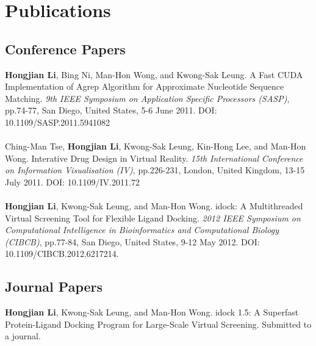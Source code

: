\chapter{Publications}

\section{Conference Papers}

\textbf{Hongjian Li}, Bing Ni, Man-Hon Wong, and Kwong-Sak Leung. A Fast CUDA Implementation of Agrep Algorithm for Approximate Nucleotide Sequence Matching. \textit{9th IEEE Symposium on Application Specific Processors (SASP)}, pp.74-77, San Diego, United States, 5-6 June 2011. DOI: 10.1109/SASP.2011.5941082
\\\\
Ching-Man Tse, \textbf{Hongjian Li}, Kwong-Sak Leung, Kin-Hong Lee, and Man-Hon Wong. Interative Drug Design in Virtual Reality. \textit{15th International Conference on Information Visualisation (IV)}, pp.226-231, London, United Kingdom, 13-15 July 2011. DOI: 10.1109/IV.2011.72
\\\\
\textbf{Hongjian Li}, Kwong-Sak Leung, and Man-Hon Wong. idock: A Multithreaded Virtual Screening Tool for Flexible Ligand Docking. \textit{2012 IEEE Symposium on Computational Intelligence in Bioinformatics and Computational Biology (CIBCB)}, pp.77-84, San Diego, United States, 9-12 May 2012. DOI: 10.1109/CIBCB.2012.6217214.

\section{Journal Papers}

\textbf{Hongjian Li}, Kwong-Sak Leung, and Man-Hon Wong. idock 1.5: A Superfast Protein-Ligand Docking Program for Large-Scale Virtual Screening. Submitted to a journal.

\chapterend
